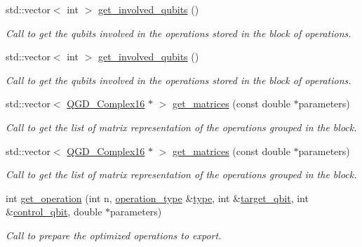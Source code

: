 \begin{DoxyCompactItemize}
std\+::vector$<$ int $>$ \hyperlink{class_operation__block_a92e4f0566e4b36830652729377a8e936}{get\+\_\+involved\+\_\+qubits} ()
\begin{DoxyCompactList}\small\item\em Call to get the qubits involved in the operations stored in the block of operations. \end{DoxyCompactList}\item 
std\+::vector$<$ int $>$ \hyperlink{class_operation__block_aebdbb71e02ff6826d967d55f4cd4db28}{get\+\_\+involved\+\_\+qubits} ()
\begin{DoxyCompactList}\small\item\em Call to get the qubits involved in the operations stored in the block of operations. \end{DoxyCompactList}\item 
std\+::vector$<$ \hyperlink{struct_q_g_d___complex16}{Q\+G\+D\+\_\+\+Complex16} $\ast$ $>$ \hyperlink{class_operation__block_aedddbc5242eab7c00125359a835ac53d}{get\+\_\+matrices} (const double $\ast$parameters)
\begin{DoxyCompactList}\small\item\em Call to get the list of matrix representation of the operations grouped in the block. \end{DoxyCompactList}\item 
std\+::vector$<$ \hyperlink{struct_q_g_d___complex16}{Q\+G\+D\+\_\+\+Complex16} $\ast$ $>$ \hyperlink{class_operation__block_af3e794fd9a409978a414af539ad23320}{get\+\_\+matrices} (const double $\ast$parameters)
\begin{DoxyCompactList}\small\item\em Call to get the list of matrix representation of the operations grouped in the block. \end{DoxyCompactList}\item 
int \hyperlink{class_decomposition___base_a64e2b692d38fe3ccbd49708d8fa24493}{get\+\_\+operation} (int n, \hyperlink{operations_2include_2_operation_8h_ad99e62941c8e4b13e5fc45ecaaf65eff}{operation\+\_\+type} \&\hyperlink{class_operation_ad47c56c86d62a4c775571e1600416479}{type}, int \&\hyperlink{class_operation_a3e489b72c124b494777c71b1646bb1e9}{target\+\_\+qbit}, int \&\hyperlink{class_operation_a9a798ea8adec5a45fd2ca07996da88e1}{control\+\_\+qbit}, double $\ast$parameters)
\begin{DoxyCompactList}\small\item\em Call to prepare the optimized operations to export. \end{DoxyCompactList}\item 

\end{DoxyCompactItemize}
